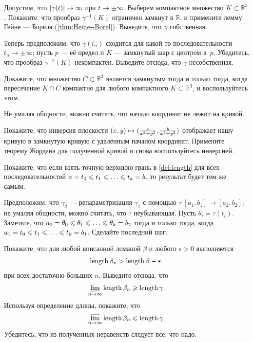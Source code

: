 \begin{multicols}{2}
Допустим, что $|\gamma(t)|\z\to\infty$ при $t\to\pm\infty$.
Выберем компактное множество $K\subset \mathbb{R}^3$.
Покажите, что прообраз $\gamma^{-1}(K)$ ограничен замкнут в $\mathbb{R}$,
и примените лемму Гейне --- Бореля (\ref{thm:Heine--Borel}).
Выведите, что $\gamma$ собственная.

Теперь предположим, что $\gamma(t_n)$ сходится для какой-то последовательности $t_n\to \pm \infty$; пусть $p$ --- её предел и $K$ --- замкнутый шар с центром в~$p$.
Убедитесь, что прообраз $\gamma^{-1}(K)$ некомпактен.
Выведите отсюда, что $\gamma$ несобственная.

Докажите, что множество $C\subset \mathbb{R}^3$ является замкнутым тогда и только тогда, когда пересечение $K\cap C$ компактно для любого компактного $K\subset \mathbb{R}^3$,
и воспользуйтесь этим.

Не умаляя общности, можно считать, что начало координат не лежит на кривой.

Покажите, что инверсия плоскости $(x,y)\z\mapsto (\tfrac{x}{x^2+y^2},\tfrac{y}{x^2+y^2})$ отображает нашу кривую в замкнутую кривую с удалённым началом координат.
Примените теорему Жордана для полученной кривой и снова воспользуйтесь инверсией.



\setcounter{eqtn}{0}

Покажите, что если взять точную верхнюю грань в \ref{def:length} для всех последовательностей
$a=t_0\le t_1\le\z\dots\le t_k=b$, то результат будет тем же самым.

Предположим, что $\gamma_2$ --- репараметризация $\gamma_1$ с помощью $\tau\:[a_1,b_1]\to [a_2,b_2]$; не умаляя общности, можно считать, что $\tau$ неубывающая.
Пусть $\theta_i=\tau(t_i)$.
Заметьте, что $a_2=\theta_0\z\le\theta_1\le \z\dots\le\theta_k=b_2$ тогда и только тогда, когда 
$a_1=t_0\le t_1\le\z\dots\le t_k=b_1$.
Сделайте последний шаг.

Покажите, что для любой вписанной ломаной $\beta$ и любого $\epsilon>0$ выполняется
\[\mathop{\rm length}\nolimits\beta_n>\mathop{\rm length}\nolimits\beta-\varepsilon.\]
при всех достаточно больших $n$.
Выведите отсюда, что
\[\varliminf_{n\to\infty}\mathop{\rm length}\nolimits\beta_n\geqslant \mathop{\rm length}\nolimits \gamma.\]
Используя определение длины, покажите, что 
\[\varlimsup_{n\to\infty}\mathop{\rm length}\nolimits\beta_n\leqslant \mathop{\rm length}\nolimits \gamma.\]
Убедитесь, что из полученных неравенств следует всё, что надо.


\end{multicols}
